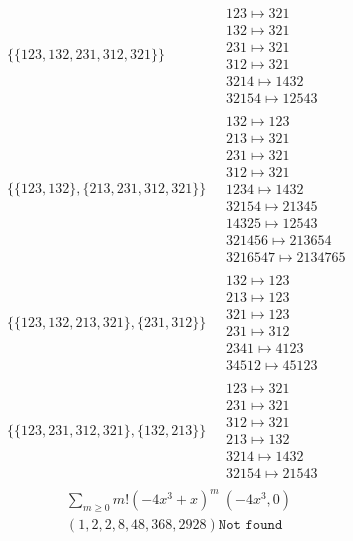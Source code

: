 \begin{scriptsize}
\begin{align}
\begin{matrix}
\end{matrix}
\\
\{\{123, 132, 231, 312, 321\}\}
\ 
&
\begin{matrix}
123 \mapsto 321\\132 \mapsto 321\\231 \mapsto 321\\312 \mapsto 321\\3214 \mapsto 1432\\32154 \mapsto 12543
\end{matrix}
\\
\{\{123, 132\}, \{213, 231, 312, 321\}\}
\ 
&
\begin{matrix}
132 \mapsto 123\\213 \mapsto 321\\231 \mapsto 321\\312 \mapsto 321\\1234 \mapsto 1432\\32154 \mapsto 21345\\14325 \mapsto 12543\\321456 \mapsto 213654\\3216547 \mapsto 2134765
\end{matrix}
\\
\{\{123, 132, 213, 321\}, \{231, 312\}\}
\ 
&
\begin{matrix}
132 \mapsto 123\\213 \mapsto 123\\321 \mapsto 123\\231 \mapsto 312\\2341 \mapsto 4123\\34512 \mapsto 45123
\end{matrix}
\\
\{\{123, 231, 312, 321\}, \{132, 213\}\}
\ 
&
\begin{matrix}
123 \mapsto 321\\231 \mapsto 321\\312 \mapsto 321\\213 \mapsto 132\\3214 \mapsto 1432\\32154 \mapsto 21543
\end{matrix}
\end{align}
$$
\begin{matrix}
\sum_{m \geq 0} m! \left(
-4 x^{3} + x
\right)^m
\ 
\left(-4 x^{3}, 0\right)
\\
\left(1, 2, 2, 8, 48, 368, 2928\right)
\texttt{Not found}
\end{matrix}
$$
\begin{align}

\end{align}
\end{scriptsize}
